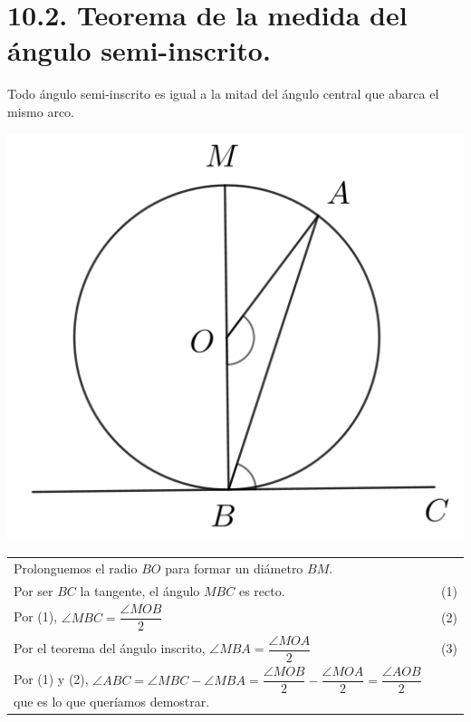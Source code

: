\documentclass[12pt,a4paper, oneside]{book}
\begin{document}
\section{10.2. Teorema de la medida del ángulo semi-inscrito.}
Todo ángulo semi-inscrito es igual a la mitad del ángulo central que abarca el mismo arco.
\\
\begin{center}
\includegraphics[scale=0.6]{Imagenes/circulo 3.png} 
\end{center}
\begin{tabular}{p{15.9 cm} p{1cm}}
Prolonguemos el radio  $BO$ para formar un diámetro $BM$. 
\\Por ser $BC$ la tangente, el ángulo $MBC$ es recto. &(1)
\\Por (1), $\angle MBC = \dfrac{\angle MOB}{2}$ &(2)
\\Por el teorema del ángulo inscrito, $\angle MBA = \dfrac{\angle MOA }{2}$&(3)
\\Por (1) y (2), $\angle ABC = \angle MBC - \angle MBA= \dfrac{\angle MOB}{2}-\dfrac{\angle MOA}{2}=\dfrac{\angle AOB}{2}$ que es lo que queríamos demostrar.
\end{tabular}
\end{document}
